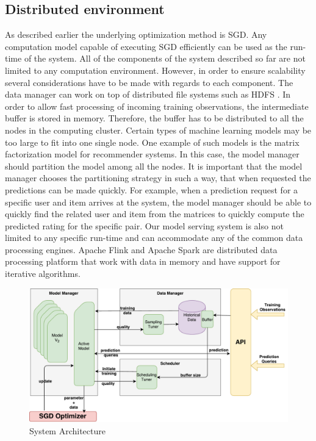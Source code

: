 \documentclass{vldb}
\begin{document}
\subsection{Distributed environment} 
As described earlier the underlying optimization method is SGD.
Any computation model capable of executing SGD efficiently can be used as the run-time of the system.
All of the components of the system described so far are not limited to any computation environment.
However, in order to ensure scalability several considerations have to be made with regards to each component.
The data manager can work on top of distributed file systems such as HDFS \cite{shvachko2010hadoop}. 
In order to allow fast processing of incoming training observations, the intermediate buffer is stored in memory.
Therefore, the buffer has to be distributed to all the nodes in the computing cluster.
Certain types of machine learning models may be too large to fit into one single node.
One example of such models is the matrix factorization model for recommender systems.
In this case, the model manager should partition the model among all the nodes.
It is important that the model manager chooses the partitioning strategy in such a way, that when requested the predictions can be made quickly.
For example, when a prediction request for a specific user and item arrives at the system, the model manager should be able to quickly find the related user and item from the matrices to quickly compute the predicted rating for the specific pair.
Our model serving system is also not limited to any specific run-time and can accommodate any of the common data processing engines.
Apache Flink \cite{carbone2015apache} and Apache Spark \cite{zaharia2010spark} are distributed data processing platform that work with data in memory and have support for iterative algorithms. %

\begin{figure}[t]
\centering
\includegraphics[width=\columnwidth]{../images/system-architecture-1.pdf}
\caption{System Architecture}
\label{fig:system-architecture}
\end{figure}
\end{document}
